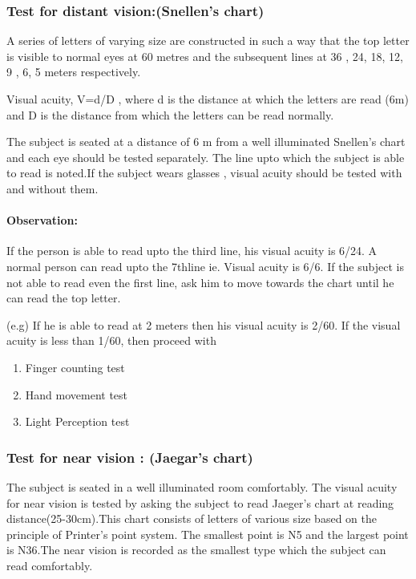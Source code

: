 \documentclass[a4paper,12pt,openany,twoside]{book}
\begin{document}
		\subsubsection*{Test for distant vision:(Snellen's chart)}
		A series of letters of varying size are constructed in such a way that the top letter is visible to normal eyes at 60 metres and the subsequent lines at 36 , 24, 18, 12, 9 , 6, 5 meters respectively. 
		\par
		Visual acuity, V=d/D , where d is the distance at which the letters are read (6m) and D is the distance from which the letters can be read normally.
		\par
		The subject is seated at a distance of 6 m from a well illuminated Snellen's chart and each eye should be tested separately. The line upto which the subject is able to read is noted.If the subject wears glasses , visual acuity should be tested with and without them.
		\paragraph{Observation:}
		If the person is able to read upto the third line, his visual acuity is 6/24. A normal person can read upto the 7thline ie. Visual acuity is 6/6. If the subject is not able to read even the first line, ask him to move towards the chart until he can read the top letter.
		\par
		(e.g) If he is able to read at 2 meters then his visual acuity is 2/60. If the visual acuity is less than 1/60, then proceed with
		\begin{enumerate}
\item{Finger counting test}
\item{Hand movement test}
\item{Light Perception test}
		\end{enumerate}

		\subsubsection*{Test for near vision : (Jaegar’s chart)}
			The subject is seated in a well illuminated room comfortably. The visual acuity for near vision is tested by asking the subject to read Jaeger's chart at reading distance(25-30cm).This chart consists of letters of various size based on the principle of  Printer’s point system. The smallest point is N5 and the largest point is N36.The near vision is recorded as the smallest type which the subject can read comfortably.
\end{document}
